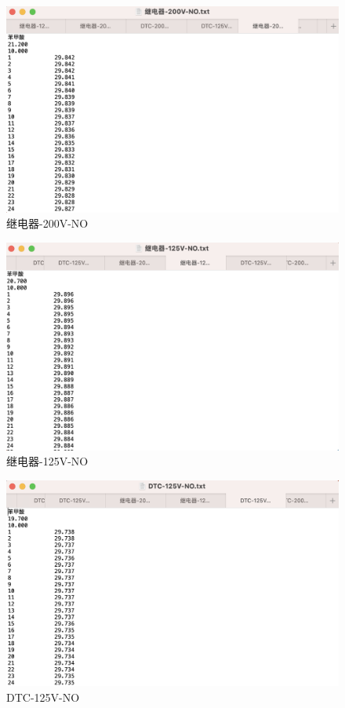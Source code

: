 \documentclass[12pt]{ctexart}
\numberwithin{equation}{section}
\begin{document}
\begin{figure}[ht]
    \centering
    \includegraphics[width=1\textwidth]{5.png}
    \caption{继电器-200V-NO}
\end{figure}

\begin{figure}[ht]
    \centering
    \includegraphics[width=1\textwidth]{6.png}
    \caption{继电器-125V-NO}
\end{figure}

\begin{figure}[ht]
    \centering
    \includegraphics[width=1\textwidth]{7.png}
    \caption{DTC-125V-NO}
\end{figure}
\end{document}
